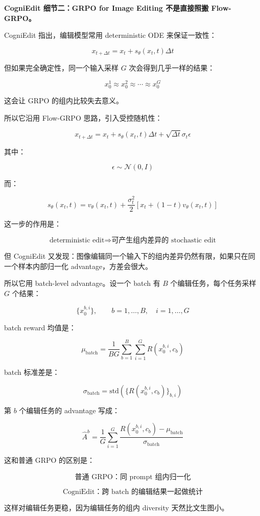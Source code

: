\textbf{CogniEdit 细节二：GRPO for Image Editing 不是直接照搬 Flow-GRPO。}

CogniEdit 指出，编辑模型常用 deterministic ODE 来保证一致性：

\[
x_{t+\Delta t}
=
x_t
+
s_\theta(x_t,t)\Delta t
\]

但如果完全确定性，同一个输入采样 $G$ 次会得到几乎一样的结果：

\[
x_0^1
\approx
x_0^2
\approx
\cdots
\approx
x_0^G
\]

这会让 GRPO 的组内比较失去意义。

所以它沿用 Flow-GRPO 思路，引入受控随机性：

\[
x_{t+\Delta t}
=
x_t
+
s_\theta(x_t,t)\Delta t
+
\sqrt{\Delta t}\sigma_t\epsilon
\]

其中：

\[
\epsilon
\sim
\mathcal{N}(0,I)
\]

而：

\[
s_\theta(x_t,t)
=
v_\theta(x_t,t)
+
\frac{\sigma_t^2}{2}
\left[
x_t
+
(1-t)v_\theta(x_t,t)
\right]
\]

这一步的作用是：

\[
\text{deterministic edit}
\Rightarrow
\text{可产生组内差异的 stochastic edit}
\]

但 CogniEdit 又发现：图像编辑同一个输入下的组内差异仍然有限，如果只在同一个样本内部归一化 advantage，方差会很大。

所以它用 batch-level advantage。设一个 batch 有 $B$ 个编辑任务，每个任务采样 $G$ 个结果：

\[
\{x_0^{b,i}\},
\qquad
b=1,\ldots,B,
\quad
i=1,\ldots,G
\]

batch reward 均值是：

\[
\mu_\text{batch}
=
\frac{1}{BG}
\sum_{b=1}^{B}
\sum_{i=1}^{G}
R(x_0^{b,i},c_b)
\]

batch 标准差是：

\[
\sigma_\text{batch}
=
\text{std}
\left(
\{R(x_0^{b,i},c_b)\}_{b,i}
\right)
\]

第 $b$ 个编辑任务的 advantage 写成：

\[
\hat{A}^{b}
=
\frac{1}{G}
\sum_{i=1}^{G}
\frac{
R(x_0^{b,i},c_b)
-
\mu_\text{batch}
}{
\sigma_\text{batch}
}
\]

这和普通 GRPO 的区别是：

\[
\text{普通 GRPO：同 prompt 组内归一化}
\]

\[
\text{CogniEdit：跨 batch 的编辑结果一起做统计}
\]

这样对编辑任务更稳，因为编辑任务的组内 diversity 天然比文生图小。

